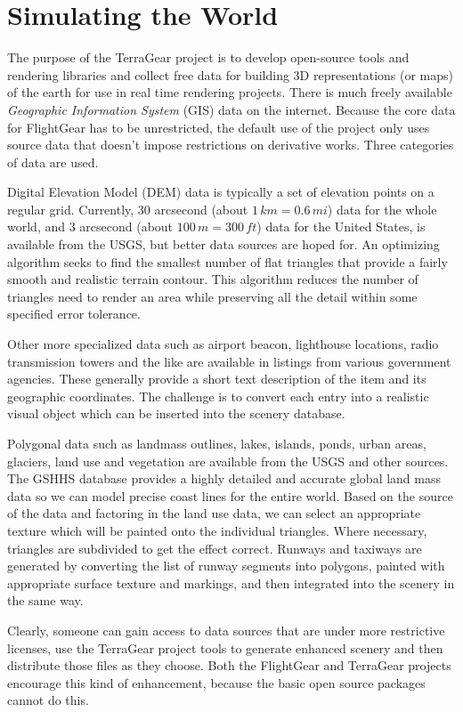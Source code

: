 \documentclass[a4paper,10pt]{article}
\begin{document}
\section*{Simulating the World}
%
The purpose of the TerraGear project\cite{terragear}
is to develop open-source tools and
rendering libraries and collect free data for building 3D
representations (or maps) of the earth for use in real time rendering
projects.
There is much freely available 
\textsl{Geographic Information System} (GIS) data on the
internet.  Because the core
data for FlightGear has to be unrestricted,
the default use of the project only uses source data that doesn't
impose restrictions on derivative
works.  Three categories of data are used.

Digital Elevation Model (DEM) data 
is typically a set of elevation points on a regular grid.  Currently,
30 arcsecond (about $1\,km=0.6\,mi$) data for the whole world,
and 3 arcsecond (about $100\,m=300\,ft$) data for the United States,
is available from the USGS, but better data sources are hoped for.
An optimizing algorithm seeks to find the smallest number of flat
triangles that provide a fairly smooth and realistic terrain contour.
This algorithm reduces the number of triangles need to render an area
while preserving all the detail within some specified error tolerance.

Other more specialized data such as airport beacon,
lighthouse locations, radio transmission towers
and the like are available
in listings from various government agencies.  These generally provide
a short text description of the item and its geographic coordinates.
The challenge is to convert each entry into a realistic visual object
which can be inserted into the scenery database.

Polygonal data such as landmass outlines, lakes, islands, ponds, urban
areas, glaciers, land use and vegetation are available from the USGS
and other sources.  The GSHHS database provides a highly detailed and
accurate global land mass data so we can model precise coast lines for
the entire world.  Based on the source of the data and factoring in
the land use data, we can select an appropriate texture which will be
painted onto the individual triangles.  Where necessary, triangles are
subdivided to get the effect correct.  Runways and taxiways are
generated by converting the list of runway segments into polygons,
painted with appropriate surface texture and markings, and then
integrated into the scenery in the same way.

Clearly, someone can gain access to data sources that are under
more restrictive licenses, use the TerraGear project tools to generate
enhanced scenery and then distribute those files as they choose.
Both the FlightGear and TerraGear projects encourage this kind
of enhancement, because the basic open source packages cannot do this.
\end{document}
